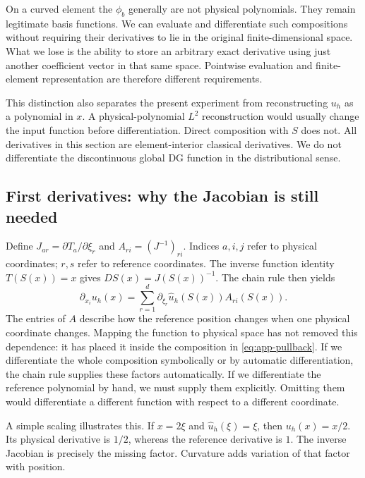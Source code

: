 On a curved element the $\phi_b$ generally are not physical polynomials.
They remain legitimate basis functions. We can evaluate and differentiate
such compositions without requiring their derivatives to lie in the
original finite-dimensional space. What we lose is the ability to store
an arbitrary exact derivative using just another coefficient vector in that
same space. Pointwise evaluation and finite-element representation are
therefore different requirements.

This distinction also separates the present experiment from reconstructing
$u_h$ as a polynomial in $x$. A physical-polynomial $L^2$ reconstruction would
usually change the input function before differentiation. Direct composition
with $S$ does not. All derivatives in this section are element-interior
classical derivatives. We do not differentiate the discontinuous global DG
function in the distributional sense.

\subsection{First derivatives: why the Jacobian is still needed}
Define $J_{ar}=\partial T_a/\partial\xi_r$ and
$A_{ri}=(J^{-1})_{ri}$. Indices $a,i,j$ refer to physical coordinates;
$r,s$ refer to reference coordinates. The inverse function identity
$T(S(x))=x$ gives $DS(x)=J(S(x))^{-1}$. The chain rule then yields
\begin{equation}
 \partial_{x_i}u_h(x)
 =\sum_{r=1}^d \partial_{\xi_r}\widehat u_h(S(x))A_{ri}(S(x)).
 \label{eq:app-first-direct}
\end{equation}
The entries of $A$ describe how the reference position changes when one
physical coordinate changes. Mapping the function to physical space has not
removed this dependence: it has placed it inside the composition in
\cref{eq:app-pullback}. If we differentiate the whole composition
symbolically or by automatic differentiation, the chain rule supplies these
factors automatically. If we differentiate the reference polynomial by hand,
we must supply them explicitly. Omitting them would differentiate a different
function with respect to a different coordinate.

A simple scaling illustrates this. If $x=2\xi$ and
$\widehat u_h(\xi)=\xi$, then $u_h(x)=x/2$. Its physical derivative is $1/2$,
whereas the reference derivative is $1$. The inverse Jacobian is precisely
the missing factor. Curvature adds variation of that factor with position.

